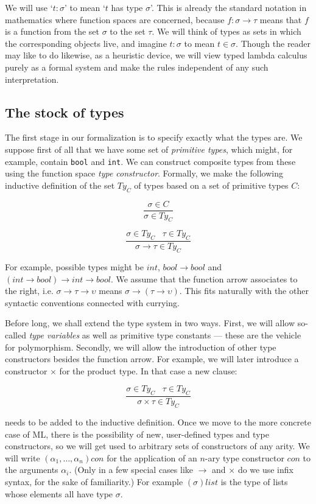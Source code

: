 We will use `$t : \sigma$' to mean `$t$ has type $\sigma$'. This is already the
standard notation in mathematics where function spaces are concerned, because
$f : \sigma \to \tau$ means that $f$ is a function from the set $\sigma$ to
the set $\tau$. We will think of types as sets in which the corresponding
objects live, and imagine $t:\sigma$ to mean $t \in \sigma$. Though the reader
may like to do likewise, as a heuristic device, we will view typed lambda
calculus purely as a formal system and make the rules independent of any such
interpretation.

\subsection{The stock of types}

The first stage in our formalization is to specify exactly what the types are.
We suppose first of all that we have some set of {\em primitive types}, which
might, for example, contain {\tt bool} and {\tt int}. We can construct
composite types from these using the function space {\em type constructor}.
Formally, we make the following inductive definition of the set $Ty_C$ of types
based on a set of primitive types $C$:

$$ \frac{\sigma \in C}{\sigma \in Ty_C} $$

$$ \frac{\sigma \in Ty_C \;\;\; \tau \in Ty_C}{\sigma \to \tau \in Ty_C} $$

For example, possible types might be $int$, $bool \to bool$ and $(int \to
bool) \to int \to bool$. We assume that the function arrow associates to the
right, i.e. $\sigma \to \tau \to \upsilon$ means $\sigma \to (\tau \to
\upsilon)$. This fits naturally with the other syntactic conventions connected
with currying.

Before long, we shall extend the type system in two ways. First, we will allow
so-called {\em type variables} as well as primitive type constants --- these
are the vehicle for polymorphism. Secondly, we will allow the introduction of
other type constructors besides the function arrow. For example, we will later
introduce a constructor $\times$ for the product type. In that case a new
clause:

$$ \frac{\sigma \in Ty_C \;\;\; \tau \in Ty_C}{\sigma \times \tau \in Ty_C}
$$

\noindent needs to be added to the inductive definition. Once we move to the
more concrete case of ML, there is the possibility of new, user-defined types
and type constructors, so we will get used to arbitrary sets of constructors of
any arity. We will write $(\alpha_1,\ldots,\alpha_n)con$ for the application of
an $n$-ary type constructor $con$ to the arguments $\alpha_i$. (Only in a few
special cases like $\to$ and $\times$ do we use infix syntax, for the sake of
familiarity.) For example $(\sigma)list$ is the type of lists whose elements
all have type $\sigma$.


